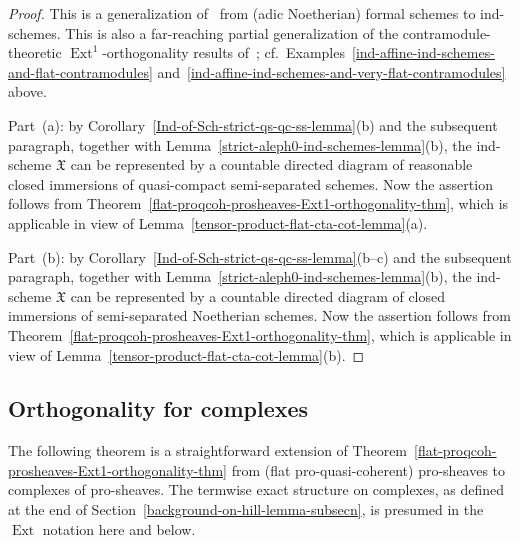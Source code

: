 \documentclass[12pt,a4paper]{amsart}
\newcommand{\+}{\protect\nobreakdash-}
\renewcommand{\:}{\colon}
\DeclareMathOperator{\Ext}{Ext}
\newcommand{\fX}{\mathfrak X}
\theoremstyle{plain}
\theoremstyle{definition}
\begin{document}
\begin{proof}
 This is a generalization of~\cite[Lemma~8.5.7]{Pform} from
(adic Noetherian) formal schemes to ind-schemes.
 This is also a far-reaching partial generalization of
the contramodule-theoretic $\Ext^1$\+orthogonality results
of~\cite[Lemma~E.4.3 and Corollary~E.5.2]{Pcosh}; cf.\
Examples~\ref{ind-affine-ind-schemes-and-flat-contramodules}
and~\ref{ind-affine-ind-schemes-and-very-flat-contramodules} above.

 Part~(a): by Corollary~\ref{Ind-of-Sch-strict-qs-qc-ss-lemma}(b)
and the subsequent paragraph, together
with Lemma~\ref{strict-aleph0-ind-schemes-lemma}(b),
the ind-scheme $\fX$ can be represented by a countable directed diagram
of reasonable closed immersions of quasi-compact semi-separated schemes.
 Now the assertion follows from
Theorem~\ref{flat-proqcoh-prosheaves-Ext1-orthogonality-thm},
which is applicable in view of
Lemma~\ref{tensor-product-flat-cta-cot-lemma}(a).

 Part~(b): by Corollary~\ref{Ind-of-Sch-strict-qs-qc-ss-lemma}(b\+-c)
and the subsequent paragraph, together
with Lemma~\ref{strict-aleph0-ind-schemes-lemma}(b),
the ind-scheme $\fX$ can be represented by a countable directed diagram
of closed immersions of semi-separated Noetherian schemes.
 Now the assertion follows from
Theorem~\ref{flat-proqcoh-prosheaves-Ext1-orthogonality-thm},
which is applicable in view of
Lemma~\ref{tensor-product-flat-cta-cot-lemma}(b).
\end{proof}

\subsection{Orthogonality for complexes}
 The following theorem is a straightforward extension of
Theorem~\ref{flat-proqcoh-prosheaves-Ext1-orthogonality-thm} from
(flat pro-quasi-coherent) pro-sheaves to complexes of pro-sheaves.
 The termwise exact structure on complexes, as defined at the end of
Section~\ref{background-on-hill-lemma-subsecn}, is presumed in
the $\Ext$ notation here and below.
\end{document}
